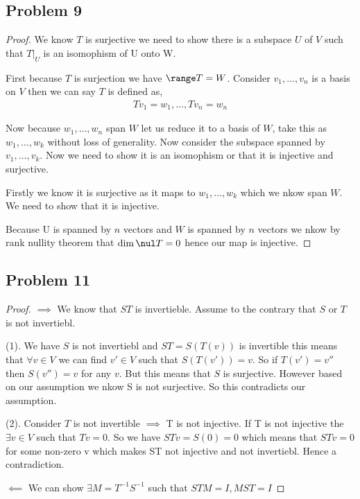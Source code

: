 \documentclass[a4paper]{report}
\begin{document}
\subsection*{Problem 9}
\begin{proof}
    We know $T$ is surjective we need to show there is a subspace $U$ of $V$ such that $T|_U$ is an isomophism of U onto W. 

    First because $T$ is surjection we have $\range T = W$. Consider $v_1,\dots,v_n$ is a basis on $V$ then we can say $T$ is defined as, 
    \begin{align*}
        Tv_1 = w_1,\dots,Tv_n = w_n 
    \end{align*}
    
    Now because $w_1,\dots,w_n$ span $W$ let us reduce it to a basis of $W$, take this as $w_1,\dots,w_k$ without loss of generality.  Now consider the subspace spanned by $v_1,\dots,v_k$. Now we need to show it is an isomophism or that it is injective and surjective.

    Firstly we know it is surjective as it maps to $w_1,\dots,w_k$ which we nkow span $W$. We need to show that it is injective.

    Because U is spanned by $n$ vectors and $W$ is spanned by $n$ vectors we nkow by rank nullity theorem that $\dim \nul T= 0$ hence  our map is injective. 

\end{proof}

\subsection*{Problem 11}
\begin{proof}
    $\implies$ We know that $ST$ is invertieble. Assume to the contrary that $S$ or $T$ is not invertiebl.

    (1). We have $S$ is not invertiebl and $ST = S(T(v))$  is invertible this means that $\forall v \in V$ we can find $v' \in V$ such that $S(T(v')) = v$.  So if $T(v') = v''$ then $S(v'') = v$ for any $v$. But this means that $S$ is surjective. However based on our assumption we nkow S is not surjective. So this contradicts our assumption.

    (2). Consider $T$ is not invertible $\implies$ T is not injective. If T is not injective the $\exists v \in V$ such that $Tv = 0$. So we have $STv = S(0) = 0$ which means that $STv = 0$  for some non-zero v which makes ST not injective and not invertiebl. Hence a contradiction.

    $\impliedby$ 
    We can show $\exists M = T^{-1}S^{-1}$ such that $STM =I, MST = I$
\end{proof}
\end{document}
